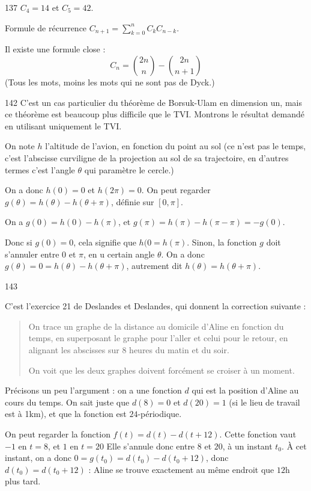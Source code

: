 \begin{Soln}{137}
$C_4=14$ et $C_5=42$.

Formule de récurrence $C_{n+1} = \sum_{k=0}^n C_kC_{n-k}$.

Il existe une formule close :
\[ C_n = \binom{2n}{n} - \binom{2n}{n+1}\]
(Tous les mots, moins les mots qui ne sont pas de Dyck.)
\end{Soln}
\begin{Soln}{142}
C'est un cas particulier du théorème de Borsuk-Ulam en dimension un, mais ce théorème est beaucoup plus difficile que le TVI. Montrons le résultat demandé en utilisant uniquement le TVI.

On note $h$ l'altitude de l'avion, en fonction du point au sol (ce n'est pas le temps, c'est l'abscisse curviligne  de la projection au sol de sa trajectoire, en d'autres termes c'est l'angle $\theta$ qui paramètre le cercle.)

On a donc $h(0)=0$ et $h(2\pi)=0$. On peut regarder $g(\theta)=h(\theta)-h(\theta+\pi)$, définie sur $[0,\pi]$.

On a $g(0)=h(0)-h(\pi)$, et $g(\pi)=h(\pi)-h(\pi-\pi) = -g(0)$.

Donc si $g(0)=0$, cela signifie que $h(0=h(\pi)$. Sinon, la fonction $g$ doit s'annuler entre $0$ et $\pi$, en u certain angle $\theta$. On a donc $g(\theta)=0=h(\theta)-h(\theta+\pi)$, autrement dit $h(\theta)=h(\theta+\pi)$.
\end{Soln}
\begin{Soln}{143}

C'est l'exercice 21 de Deslandes et Deslandes, qui donnent la correction suivante :

\begin{quote}
On trace un graphe de la distance au domicile d'Aline en fonction du temps, en superposant le graphe pour l'aller et celui pour le retour, en alignant les abscisses sur $8$ heures du matin et du soir.

On voit que les deux graphes doivent forcément se croiser à un moment.
\end{quote}

Précisons un peu l'argument : on a une fonction $d$ qui est la position d'Aline au cours du temps. On sait juste que $d(8)=0$ et $d(20)=1$ (si le lieu de travail est à 1km), et que la fonction est $24$-périodique.

On peut regarder la fonction $f(t)=d(t)-d(t+12)$. Cette fonction vaut $-1$ en $t=8$, et $1$ en $t=20$ Elle s'annule donc entre $8$ et $20$, à un instant $t_0$. À cet instant, on a donc $0=g(t_0)=d(t_0)-d(t_0+12)$, donc $d(t_0)=d(t_0+12)$ : Aline se trouve exactement au même endroit que $12$h plus tard.
\end{Soln}
